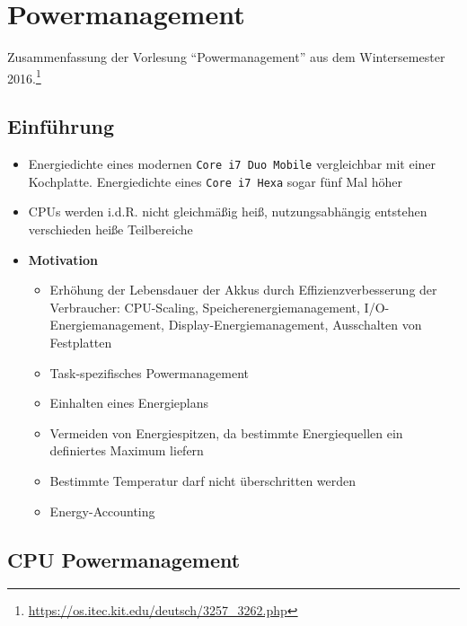 \chapter{Powermanagement}

Zusammenfassung der Vorlesung "`Powermanagement"' aus dem Wintersemester 2016.\footnote{\url{https://os.itec.kit.edu/deutsch/3257_3262.php}}

\section{Einführung}
\begin{itemize}
	\item Energiedichte eines modernen \texttt{Core i7 Duo Mobile} vergleichbar mit einer Kochplatte. Energiedichte eines \texttt{Core i7 Hexa} sogar fünf Mal höher
	\item CPUs werden i.d.R. nicht gleichmäßig heiß, nutzungsabhängig entstehen verschieden heiße Teilbereiche
	\item \textbf{Motivation}
	\begin{itemize}
		\item Erhöhung der Lebensdauer der Akkus durch Effizienzverbesserung der Verbraucher: CPU-Scaling, Speicherenergiemanagement, I/O-Energiemanagement, Display-Energiemanagement, Ausschalten von Festplatten
		\item Task-spezifisches Powermanagement
		\item Einhalten eines Energieplans
		\item Vermeiden von Energiespitzen, da bestimmte Energiequellen ein definiertes Maximum liefern
		\item Bestimmte Temperatur darf nicht überschritten werden
		\item Energy-Accounting
	\end{itemize}
\end{itemize}



\section{CPU Powermanagement}


